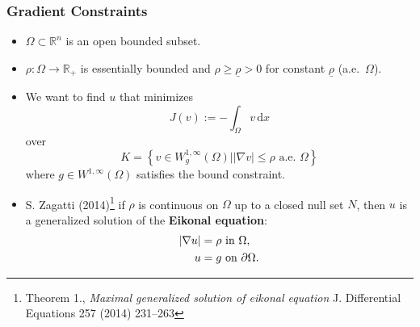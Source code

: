 \documentclass[aspectratio=169,xcolor=dvipsnames,11pt]{beamer}
\begin{document}
\begin{frame}\frametitle{Gradient Constraints}
 \hypertarget{eikonal}{}  %
    \hyperlink{extensions}{}
\begin{itemize}
\item  $\Omega \subset \mathbb R^n$ is an open bounded subset.
\item  $\rho : \Omega \to \mathbb R_+$ is essentially bounded and $\rho \ge \underline{\rho} > 0$ for constant $\underline{\rho}$ (a.e.\ $\Omega$).
\item We want to find $u$  that  minimizes 
\[
J(v) := -\int_{\Omega} v \, \mathrm{d} x 
\] 
over
\[
K = \left\{
v \in W^{1,\infty}_g(\Omega) \left| | \nabla v | \le \rho \text{ a.e. } \Omega \right.
\right\}
\] 
where $g \in W^{1,\infty}(\Omega)$ satisfies the bound constraint. \pause
\item S. Zagatti (2014)\footnote{\tiny Theorem 1., \textit{Maximal generalized solution of eikonal equation}  J. Differential Equations 257 (2014) 231–263 } if $\rho$ is continuous on $\Omega$ up to a closed null set $N$, then $u$ is a generalized solution of the \textbf{Eikonal equation}:
\begin{equation}\label{eq:eik}
\aligned
|\nabla u| &= \rho \text{ in } \Omega,\\
u &= g \text{ on } \partial \Omega.
\endaligned
\end{equation}
\end{itemize}
\end{frame}
\end{document}
